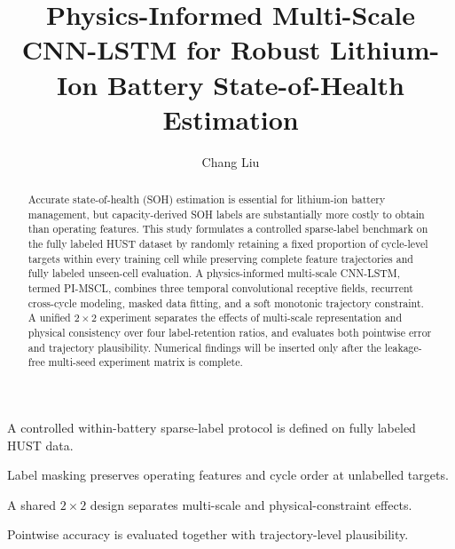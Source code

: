 \documentclass[a4paper,fleqn]{cas-dc}
\begin{document}
\let\WriteBookmarks\relax
\def\floatpagepagefraction{1}
\def\textpagefraction{.001}


\title[mode=title]{Physics-Informed Multi-Scale CNN-LSTM for Robust Lithium-Ion Battery State-of-Health Estimation}

\author[1]{Chang Liu}
\cormark[1]



\begin{abstract}
Accurate state-of-health (SOH) estimation is essential for lithium-ion battery management, but capacity-derived SOH labels are substantially more costly to obtain than operating features. This study formulates a controlled sparse-label benchmark on the fully labeled HUST dataset by randomly retaining a fixed proportion of cycle-level targets within every training cell while preserving complete feature trajectories and fully labeled unseen-cell evaluation. A physics-informed multi-scale CNN-LSTM, termed PI-MSCL, combines three temporal convolutional receptive fields, recurrent cross-cycle modeling, masked data fitting, and a soft monotonic trajectory constraint. A unified $2\times2$ experiment separates the effects of multi-scale representation and physical consistency over four label-retention ratios, and evaluates both pointwise error and trajectory plausibility. Numerical findings will be inserted only after the leakage-free multi-seed experiment matrix is complete.
\end{abstract}

\begin{highlights}
\item A controlled within-battery sparse-label protocol is defined on fully labeled HUST data.
\item Label masking preserves operating features and cycle order at unlabelled targets.
\item A shared $2\times2$ design separates multi-scale and physical-constraint effects.
\item Pointwise accuracy is evaluated together with trajectory-level plausibility.
\end{highlights}
\end{document}
